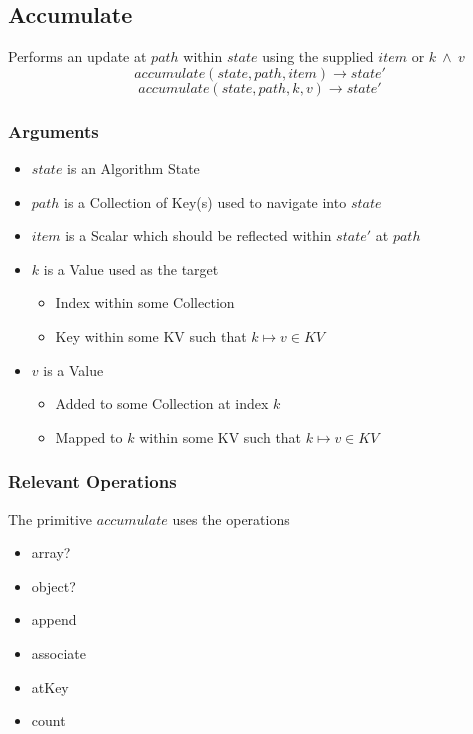 \documentclass[../main.tex]{subfiles}
\begin{document}
\subsection{Accumulate}
Performs an update at $path$ within $state$ using the supplied $item$ or $k \ \land \ v$
$$accumulate(state, path, item) \to state'$$
$$accumulate(state, path, k, v) \to state'$$

\subsubsection{Arguments}
\begin{itemize}
\item $state$ is an Algorithm State
\item $path$ is a Collection of Key(s) used to navigate into $state$
\item $item$ is a Scalar which should be reflected within $state'$ at $path$
\item $k$    is a Value used as the target
  \begin{itemize}
  \item Index within some Collection
  \item Key within some KV such that $k \mapsto v \in KV$
  \end{itemize}
\item $v$ is a Value
  \begin{itemize}
  \item Added to some Collection at index $k$
  \item Mapped to $k$ within some KV such that $k \mapsto v \in KV$
  \end{itemize}
\end{itemize}


\subsubsection{Relevant Operations}
The primitive $accumulate$ uses the operations
\begin{itemize}
\item array?
\item object?
\item append
\item associate
\item atKey
\item count
\end{itemize}
\end{document}
